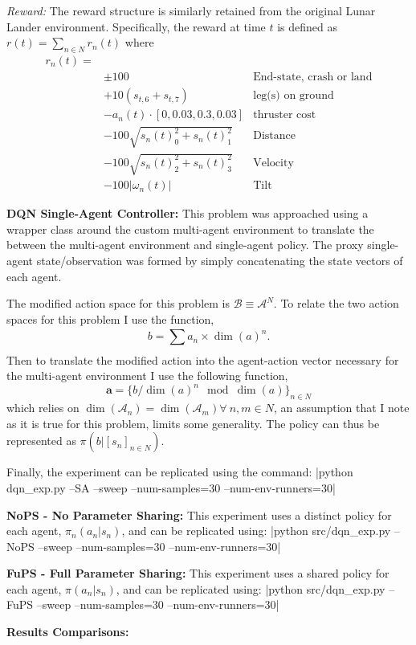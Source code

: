 \documentclass[12pt,letterpaper]{exam}
\begin{document}
\begin{questions}
	\emph{Reward:} The reward structure is similarly retained from 
	the original Lunar Lander environment. Specifically, the reward
	at time \(t\) is defined as
	\(r(t) = \sum_{n\in N} r_n(t)\)
	where
	\begin{align*}
        r_n(t) = \\
        & \pm 100                   & \text{End-state, crash or land} \\
        & +10 (s_{t,6} + s_{t,7})   & \text{leg(s) on ground} \\
        & -a_n(t)\cdot [0,0.03,0.3,0.03] & \text{thruster cost} \\
        & - 100\sqrt{s_{n}(t)_0^2+s_{n}(t)_1^2} & \text{Distance} \\
        & - 100\sqrt{s_{n}(t)_2^2+s_{n}(t)_3^2} & \text{Velocity} \\
        & - 100|\omega_n(t)| & \text{Tilt}
    \end{align*}

	\question \textbf{DQN Single-Agent Controller:}
	This problem was approached using a wrapper class around the
	custom multi-agent environment to translate the between the 
	multi-agent environment and single-agent policy. 
	The proxy single-agent state/observation was formed by simply 
	concatenating the state vectors of each agent.

	The modified action space for this problem is
	\(\mathcal{B} \equiv \mathcal{A}^N\).
	To relate the two action spaces for this problem I use the function,
	\[ b = \sum_{}^{} a_n \times \dim(a)^n. \]
	Then to translate the modified action into the agent-action vector 
	necessary for the multi-agent environment I use the following function,
	\[ \mathbf{a} = \{b/\dim(a)^n \mod\dim(a) \}_{n\in N} \] which 
	relies on \(\dim(\mathcal{A}_n)=\dim(\mathcal{A}_m)\forall\ n,m\in N\),
	an assumption that I note as it is true for this problem, 
	limits some generality.
	The policy can thus be represented as \(\pi(b \big| [s_n]_{n\in N})\).

	Finally, the experiment can be replicated using the command:	
|python dqn_exp.py --SA --sweep --num-samples=30 --num-env-runners=30|
	



	\question \textbf{NoPS - No Parameter Sharing:}
	This experiment uses a distinct policy for each agent, 
	\(\pi_n(a_n|s_n)\),
	and can be replicated using:
|python src/dqn_exp.py --NoPS --sweep --num-samples=30 --num-env-runners=30|
	

	
	\question \textbf{FuPS - Full Parameter Sharing:}
	This experiment uses a shared policy for each agent, 
	\(\pi(a_n|s_n)\),
	and can be replicated using:
|python src/dqn_exp.py --FuPS --sweep --num-samples=30 --num-env-runners=30|


	\question \textbf{Results Comparisons:}
\end{questions}
\end{document}
